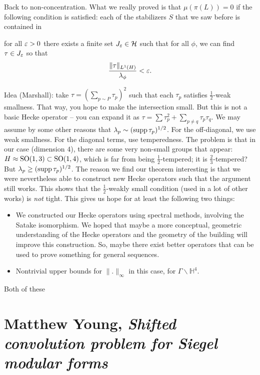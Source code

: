 \documentclass[reqno]{amsart} 
\begin{document}
Back to non-concentration.  What we really proved is that $\mu(\pi(L)) = 0$ if the following condition is satisfied: each of the stabilizers $S$ that we saw before is contained in

for all $\varepsilon > 0$ there exists a finite set $J_\varepsilon \in \mathcal{H}$ such that for all $\phi$, we can find $\tau \in J_\varepsilon$ so that
\begin{equation*}
  \frac{\lVert \tau \rVert_{L^1(H)}}{\lambda_\phi} < \varepsilon.
\end{equation*}

Idea (Marshall): take $\tau = \left( \sum_{p \sim P} \tau_p \right)^2$ such that each $\tau_p$ satisfies $\tfrac{1}{2}$-weak smallness.  That way, you hope to make the intersection small.  But this is not a basic Hecke operator -- you can expand it as $\tau = \sum \tau_p^2 + \sum_{p \neq q} \tau_p \tau_q$.  We may assume by some other reasons that $\lambda_p \sim(\operatorname{supp} \tau_p)^{1/2}$.  For the off-diagonal, we use weak smallness.  For the diagonal terms, use temperedness.  The problem is that in our case (dimension $4$), there are some very non-small groups that appear: $H \approx \operatorname{SO}(1, 3) \subset \operatorname{SO}(1, 4)$, which is far from being $\tfrac{1}{2}$-tempered; it is $\tfrac{2}{3}$-tempered?  But $\lambda_p \geq(\operatorname{supp} \tau_p)^{1/2}$.  The reason we find our theorem interesting is that we were nevertheless able to construct new Hecke operators such that the argument still works.  This shows that the $\tfrac{1}{2}$-weakly small condition (used in a lot of other works) is \emph{not} tight.  This gives us hope for at least the following two things:
\begin{itemize}
\item We constructed our Hecke operators using spectral methods, involving the Satake isomorphism.  We hoped that maybe a more conceptual, geometric understanding of the Hecke operators and the geometry of the building will improve this construction.  So, maybe there exist better operators that can be used to prove something for general sequences.
\item Nontrivial upper bounds for $\lVert . \rVert_\infty$ in this case, for $\Gamma \backslash \mathbb{H}^4$.
\end{itemize}
Both of these

\section{Matthew Young, \emph{Shifted convolution problem for Siegel modular forms}}
\end{document}
